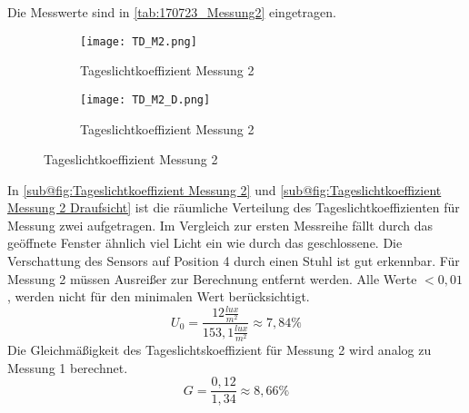   Die Messwerte sind in \autoref{tab:170723_Messung2} eingetragen.
\begin{figure}[H]
  \centering
  \begin{subfigure}[c]{0.5\textwidth}
      \texttt{[image: TD\_M2.png]}
      \caption{Tageslichtkoeffizient Messung 2}
      \label{fig:Tageslichtkoeffizient Messung 2}
  \end{subfigure}
  \hfill
  \begin{subfigure}[c]{0.4\textwidth}
      \texttt{[image: TD\_M2\_D.png]}
      \caption{Tageslichtkoeffizient Messung 2}
      \label{fig:Tageslichtkoeffizient Messung 2 Draufsicht}
  \end{subfigure}
  \label{fig:Messung 2 Tageslichtkoeffizient}
  \end{figure}
  In \autoref{sub@fig:Tageslichtkoeffizient Messung 2} und \autoref{sub@fig:Tageslichtkoeffizient Messung 2 Draufsicht} ist die räumliche Verteilung des Tageslichtkoeffizienten für Messung zwei aufgetragen.
  Im Vergleich zur ersten Messreihe fällt durch das geöffnete Fenster ähnlich viel Licht ein wie durch das geschlossene. Die Verschattung des Sensors auf Position 4 durch einen Stuhl ist gut erkennbar.
  Für Messung 2 müssen Ausreißer zur Berechnung entfernt werden. Alle Werte $<0,01$, werden nicht für den minimalen Wert berücksichtigt.
  $$U_0 = \frac{12\frac{lux}{m^2}}{153,1\frac{lux}{m^2}}\approx 7,84 \%$$
  Die Gleichmäßigkeit des Tageslichtskoeffizient für Messung 2 wird analog zu Messung 1 berechnet.
  $$G =\frac{0,12}{1,34}\approx 8,66\% $$
\newpage
